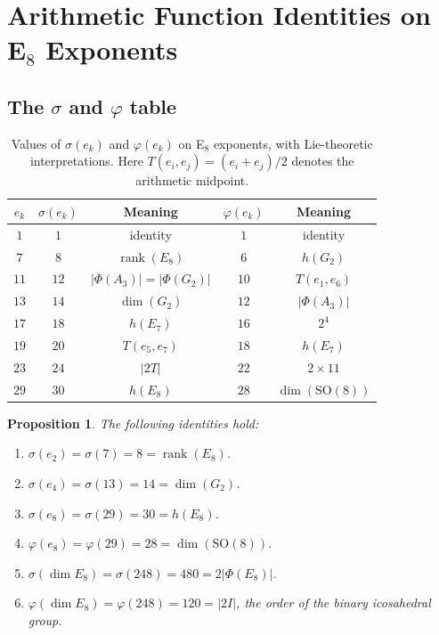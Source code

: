 \documentclass[11pt]{amsart}
\theoremstyle{plain}
\newtheorem{proposition}[theorem]{Proposition}
\theoremstyle{definition}
\theoremstyle{remark}
\renewcommand{\Phi}{\varPhi}
\newcommand{\rank}{\operatorname{rank}}
\begin{document}
\section{Arithmetic Function Identities on E$_8$ Exponents}
\label{sec:identities}

\subsection{The $\sigma$ and $\varphi$ table}

\begin{table}[ht]
\centering
\caption{Values of $\sigma(e_k)$ and $\varphi(e_k)$ on E$_8$ exponents,
  with Lie-theoretic interpretations.  Here $T(e_i,e_j) = (e_i+e_j)/2$
  denotes the arithmetic midpoint.}\label{tab:sigma-phi}
\begin{tabular}{@{}ccccc@{}}
\toprule
$e_k$ & $\sigma(e_k)$ & Meaning & $\varphi(e_k)$ & Meaning \\
\midrule
$1$  & $1$  & identity & $1$  & identity \\
$7$  & $8$  & $\rank(E_8)$ & $6$  & $h(G_2)$ \\
$11$ & $12$ & $|\Phi(A_3)| = |\Phi(G_2)|$ & $10$ & $T(e_1,e_6)$ \\
$13$ & $14$ & $\dim(G_2)$ & $12$ & $|\Phi(A_3)|$ \\
$17$ & $18$ & $h(E_7)$ & $16$ & $2^4$ \\
$19$ & $20$ & $T(e_5,e_7)$ & $18$ & $h(E_7)$ \\
$23$ & $24$ & $|2T|$ & $22$ & $2 \times 11$ \\
$29$ & $30$ & $h(E_8)$ & $28$ & $\dim(\mathrm{SO}(8))$ \\
\bottomrule
\end{tabular}
\end{table}

\begin{proposition}\label{prop:sigma-identities}
The following identities hold:
\begin{enumerate}[\upshape(i)]
  \item $\sigma(e_2) = \sigma(7) = 8 = \rank(E_8)$.
  \item $\sigma(e_4) = \sigma(13) = 14 = \dim(G_2)$.
  \item $\sigma(e_8) = \sigma(29) = 30 = h(E_8)$.
  \item $\varphi(e_8) = \varphi(29) = 28 = \dim(\mathrm{SO}(8))$.
  \item $\sigma(\dim E_8) = \sigma(248) = 480 = 2|\Phi(E_8)|$.
  \item $\varphi(\dim E_8) = \varphi(248) = 120 = |2I|$, the order of
    the binary icosahedral group.
\end{enumerate}
\end{proposition}
\end{document}
